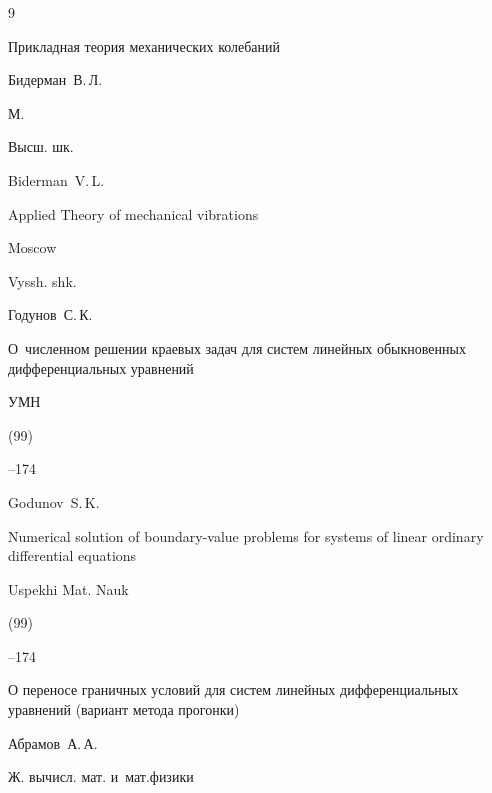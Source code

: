 \begin{thebibliography}{9}




\book Прикладная теория механических колебаний

\by Бидерман~В.\,Л.

\publaddr М.

\publ Высш. шк.



\misctransl

\by Biderman~V.\,L.

\book Applied Theory of mechanical vibrations

\publaddr Moscow

\publ Vyssh. shk.








\by Годунов~С.\,К.

\paper О~численном решении краевых задач для систем линейных обыкновенных дифференциальных уравнений

\jour УМН



(99)

--174

\misctransl

\by Godunov~S.\,K. 

\paper Numerical solution of boundary-value problems for systems of linear ordinary differential equations

\jour Uspekhi Mat. Nauk



(99)

--174






\paper О переносе  граничных условий для систем линейных дифференциальных уравнений (вариант метода прогонки)

\by Абрамов~А.\,А.

\jour Ж. вычисл. мат. и~мат.физики



\end{thebibliography}
